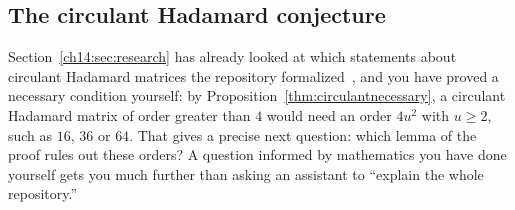\subsection*{The circulant Hadamard conjecture}
Section~\ref{ch14:sec:research} has already looked at which statements about circulant Hadamard matrices the repository formalized~\cite{oai179}, and you have proved a necessary condition yourself: by Proposition~\ref{thm:circulantnecessary}, a circulant Hadamard matrix of order greater than $4$ would need an order $4u^2$ with $u\ge2$, such as $16$, $36$ or $64$. That gives a precise next question: which lemma of the proof rules out these orders? A question informed by mathematics you have done yourself gets you much further than asking an assistant to ``explain the whole repository.''

